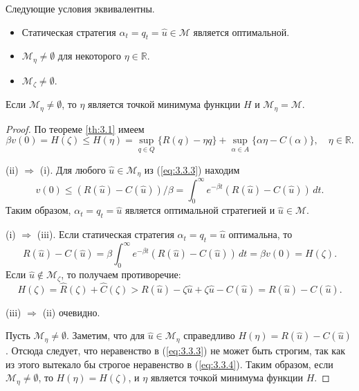 \begin{theorem} \label{th:3.3}
Следующие условия эквивалентны.
\begin{itemize}
\item[(i)] Статическая стратегия $\alpha_t=q_t= \widehat u\in\mathscr M$ является оптимальной.
\item[(ii)]  $\mathscr M_\eta\neq\emptyset$ для некоторого $\eta\in\mathbb R$.
\item[(iii)]  $\mathscr M_\zeta\neq\emptyset$.
\end{itemize}
Если $\mathscr M_\eta\neq\emptyset$, то $\eta$ является точкой минимума функции $H$ и $\mathscr M_\eta=\mathscr M$.
\end{theorem}
\begin{proof}
По теореме \ref{th:3.1} имеем
\begin{equation} \label{eq:3.3.3}
\beta v(0)=H(\zeta)\le H(\eta)=\sup_{q\in Q}\{R(q)-\eta q\}+\sup_{\alpha\in A}\{\alpha\eta-C(\alpha)\},\quad \eta\in\mathbb R.
\end{equation}

(ii) $\Longrightarrow$ (i). Для любого $\widehat u\in\mathscr M_\eta$ из (\ref{eq:3.3.3}) находим
\begin{equation} \label{eq:3.3.4}
v(0)\le (R(\widehat u)-C(\widehat u))/\beta=\int_0^\infty e^{-\beta t}(R(\widehat u)-C(\widehat u))\,dt.
\end{equation}
Таким образом, $\alpha_t=q_t= \widehat u$ является оптимальной стратегией и $\widehat u\in\mathscr M$.

(i) $\Longrightarrow$ (iii). Если статическая стратегия $\alpha_t=q_t= \widehat u$ оптимальна, то
$$ R(\widehat u)-C(\widehat u)=\beta\int_0^\infty e^{-\beta t}(R(\widehat u)-C(\widehat u))\,dt=\beta v(0)=H(\zeta).$$
Если $\widehat u\not\in\mathscr M_\zeta$, то получаем противоречие:
$$ H(\zeta)=\widehat R(\zeta)+\widehat C(\zeta)>R(\widehat u)-\zeta\widehat u+\zeta\widehat u-C(\widehat u)=R(\widehat u)-C(\widehat u).$$

(iii) $\Longrightarrow$ (ii) очевидно.

Пусть $\mathscr M_\eta\neq\emptyset$. Заметим, что для $\widehat u\in\mathscr M_\eta$ справедливо $H(\eta)=R(\widehat u)-C(\widehat u)$.
Отсюда следует, что неравенство в (\ref{eq:3.3.3}) не может быть строгим, так как из этого вытекало бы строгое неравенство в (\ref{eq:3.3.4}). Таким образом, если $\mathscr M_\eta\neq\emptyset$, то $H(\eta)=H(\zeta)$, и $\eta$ является точкой минимума функции $H$.


\end{proof}
